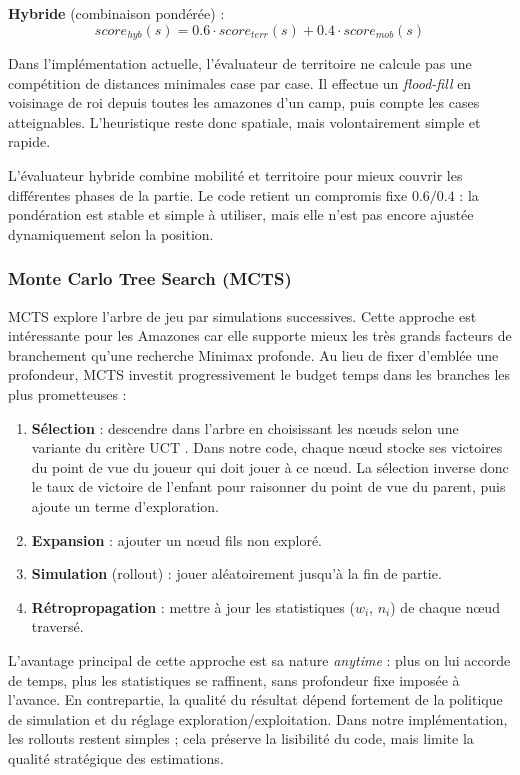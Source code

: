 \documentclass[a4paper]{article}
\begin{document}
\textbf{Hybride} (combinaison pondérée) :
\[
score_{hyb}(s) = 0.6 \cdot score_{terr}(s) + 0.4 \cdot score_{mob}(s)
\]

Dans l'implémentation actuelle, l'évaluateur de territoire ne calcule pas une compétition de distances minimales case par case. Il effectue un \emph{flood-fill} en voisinage de roi depuis toutes les amazones d'un camp, puis compte les cases atteignables. L'heuristique reste donc spatiale, mais volontairement simple et rapide.

L'évaluateur hybride combine mobilité et territoire pour mieux couvrir les différentes phases de la partie. Le code retient un compromis fixe $0.6/0.4$ : la pondération est stable et simple à utiliser, mais elle n'est pas encore ajustée dynamiquement selon la position.

\subsubsection{Monte Carlo Tree Search (MCTS)}

MCTS \cite{browne2012mcts} explore l'arbre de jeu par simulations successives. Cette approche est intéressante pour les Amazones car elle supporte mieux les très grands facteurs de branchement qu'une recherche Minimax profonde. Au lieu de fixer d'emblée une profondeur, MCTS investit progressivement le budget temps dans les branches les plus prometteuses :

\begin{enumerate}
    \item \textbf{Sélection} : descendre dans l'arbre en choisissant les nœuds selon une variante du critère UCT \cite{kocsis2006uct}. Dans notre code, chaque nœud stocke ses victoires du point de vue du joueur qui doit jouer à ce nœud. La sélection inverse donc le taux de victoire de l'enfant pour raisonner du point de vue du parent, puis ajoute un terme d'exploration.
    \item \textbf{Expansion} : ajouter un nœud fils non exploré.
    \item \textbf{Simulation} (rollout) : jouer aléatoirement jusqu'à la fin de partie.
    \item \textbf{Rétropropagation} : mettre à jour les statistiques ($w_i$, $n_i$) de chaque nœud traversé.
\end{enumerate}

L'avantage principal de cette approche est sa nature \emph{anytime} : plus on lui accorde de temps, plus les statistiques se raffinent, sans profondeur fixe imposée à l'avance. En contrepartie, la qualité du résultat dépend fortement de la politique de simulation et du réglage exploration/exploitation. Dans notre implémentation, les rollouts restent simples ; cela préserve la lisibilité du code, mais limite la qualité stratégique des estimations.
\end{document}
